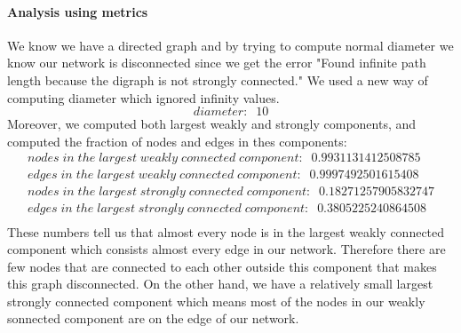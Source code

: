 \documentclass[letterpaper, 11pt]{article}
\newcommand{\1}{\mathds{1}}	%
\theoremstyle{definition}
\begin{document}
\paragraph{Analysis using metrics}We know we have a directed graph and by trying to compute normal diameter we know our network is disconnected since we get the error "Found infinite path length because the digraph is not strongly connected." We used a new way of computing diameter which ignored infinity values.
\begin{equation}
diameter:\;\; 10
\end{equation}
Moreover, we computed both largest weakly and strongly components, and computed the fraction of nodes and edges in thes components:
\begin{equation}
\begin{split} 
nodes\; in\; the\; largest\; weakly\; connected\; component:\;\; 0.9931131412508785 \\
edges\; in\; the\; largest\; weakly\; connected\; component:\;\; 0.9997492501615408 \\
nodes\; in\; the\; largest\; strongly\; connected\; component:\;\; 0.18271257905832747 \\
edges\; in\; the\; largest\; strongly\; connected\; component:\;\; 0.3805225240864508 \\
\end{split}
\end{equation}
These numbers tell us that almost every node is in the largest weakly connected component which consists almost every edge in our network. Therefore there are few nodes that are connected to each other outside this component that makes this graph disconnected. On the other hand, we have a relatively small largest strongly connected component which means most of the nodes in our weakly sonnected component are on the edge of our network.
\end{document}
